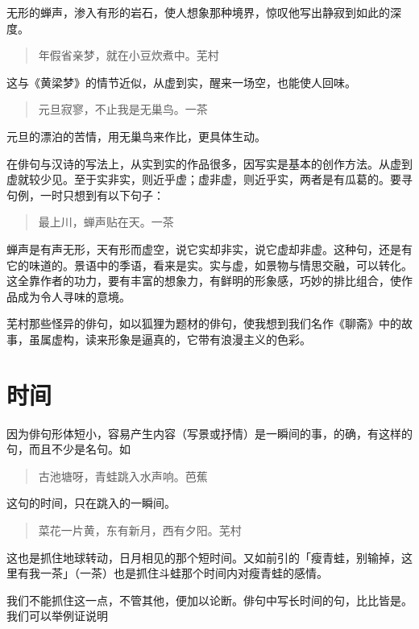 {  无形的蝉声，渗入有形的岩石，使人想象那种境界，惊叹他写出静寂到如此的深度。

  \begin{quote}
      年假省亲梦，就在小豆炊煮中。\hfill 芜村
  \end{quote}

  这与《黄梁梦》的情节近似，从虚到实，醒来一场空，也能使人回味。

  \begin{quote}
      元旦寂寥，不止我是无巢鸟。\hfill 一茶
  \end{quote}

  元旦的漂泊的苦情，用无巢鸟来作比，更具体生动。

  在俳句与汉诗的写法上，从实到实的作品很多，因写实是基本的创作方法。从虚到虚就较少见。至于实非实，则近乎虚；虚非虚，则近乎实，两者是有瓜葛的。要寻句例，一时只想到有以下句子：

  \begin{quote}
      最上川，蝉声贴在天。\hfill 一茶
  \end{quote}

  蝉声是有声无形，天有形而虚空，说它实却非实，说它虚却非虚。这种句，还是有它的味道的。景语中的季语，看来是实。实与虚，如景物与情思交融，可以转化。这全靠作者的功力，要有丰富的想象力，有鲜明的形象感，巧妙的排比组合，使作品成为令人寻味的意境。

  芜村那些怪异的俳句，如以狐狸为题材的俳句，使我想到我们名作《聊斋》中的故事，虽属虚构，读来形象是逼真的，它带有浪漫主义的色彩。

  \section*{\FS 时间}

  因为俳句形体短小，容易产生内容（写景或抒情）是一瞬间的事，的确，有这样的句，而且不少是名句。如

  \begin{quote}
      古池塘呀，青蛙跳入水声响。\hfill 芭蕉
  \end{quote}

  这句的时间，只在跳入的一瞬间。

  \begin{quote}
      菜花一片黄，东有新月，西有夕阳。\hfill 芜村
  \end{quote}

  这也是抓住地球转动，日月相见的那个短时间。又如前引的「瘦青蛙，别输掉，这里有我一茶」（一茶）也是抓住斗蛙那个时间内对瘦青蛙的感情。

  我们不能抓住这一点，不管其他，便加以论断。俳句中写长时间的句，比比皆是。我们可以举例证说明

}
